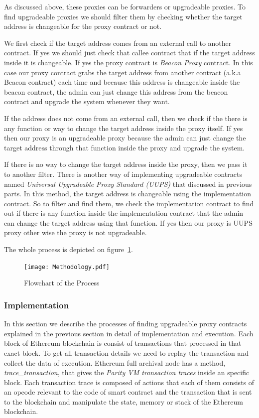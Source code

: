 As discussed above, these proxies can be forwarders or upgradeable proxies. To find upgradeable proxies we should filter them by checking whether the target address is changeable for the proxy contract or not.

We first check if the target address comes from an external call to another contract. If yes we should just check that callee contract that if the target address inside it is changeable. If yes the proxy contract is \textit{Beacon Proxy} contract. In this case our proxy contract grabs the target address from another contract (a.k.a Beacon contract) each time and because this address is changeable inside the beacon contract, the admin can just change this address from the beacon contract and upgrade the system whenever they want.

If the address does not come from an external call, then we check if the there is any function or way to change the target address inside the proxy itself. If yes then our proxy is an upgradeable proxy because the admin can just change the target address through that function inside the proxy and upgrade the system.

If there is no way to change the target address inside the proxy, then we pass it to another filter. There is another way of implementing upgradeable contracts named \textit{Universal Upgradeable Proxy Standard (UUPS)} that discussed in previous parts. In this method, the target address is changeable using the implementation contract. So to filter and find them, we check the implementation contract to find out if there is any function inside the implementation contract that the admin can change the target address using that function. If yes then our proxy is UUPS proxy other wise the proxy is not upgradeable.

The whole process is depicted on figure~\ref{flowchart}.

\begin{figure}[t]
  \texttt{[image: Methodology.pdf]}\label{flowchart}
  \caption{Flowchart of the Process}
\end{figure}


\subsubsection{Implementation}
In this section we describe the processes of finding upgradeable proxy contracts explained in the previous section in detail of implementation and execution. 
Each block of Ethereum blockchain is consist of transactions that processed in that exact block. To get all transaction details we need to replay the transaction and collect the data of execution. Ethereum full archival node has a method, \textit{trace\_transaction},  that gives the \textit{Parity VM transaction traces} inside an specific block. Each transaction trace is composed of actions that each of them consists of an opcode relevant to the code of smart contract and the transaction that is sent to the blockchain and manipulate the state, memory or stack of the Ethereum blockchain. 

